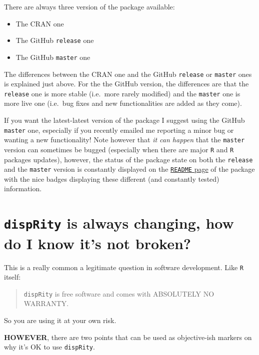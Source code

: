 \documentclass[
]{book}
\providecommand{\tightlist}{%
  \setlength{\itemsep}{0pt}\setlength{\parskip}{0pt}}
\begin{document}
There are always three version of the package available:

\begin{itemize}
\tightlist
\item
  The CRAN one
\item
  The GitHub \texttt{release} one
\item
  The GitHub \texttt{master} one
\end{itemize}

The differences between the CRAN one and the GitHub \texttt{release} or \texttt{master} ones is explained just above.
For the the GitHub version, the differences are that the \texttt{release} one is more stable (i.e.~more rarely modified) and the \texttt{master} one is more live one (i.e.~bug fixes and new functionalities are added as they come).

If you want the latest-latest version of the package I suggest using the GitHub \texttt{master} one, especially if you recently emailed me reporting a minor bug or wanting a new functionality!
Note however that \emph{it can happen} that the \texttt{master} version can sometimes be bugged (especially when there are major \texttt{R} and \texttt{R} packages updates), however, the status of the package state on both the \texttt{release} and the \texttt{master} version is constantly displayed on the \href{https://github.com/TGuillerme/dispRity/}{\texttt{README} page} of the package with the nice badges displaying these different (and constantly tested) information.

\hypertarget{disprity-is-always-changing-how-do-i-know-its-not-broken}{%
\section{\texorpdfstring{\texttt{dispRity} is always changing, how do I know it's not broken?}{dispRity is always changing, how do I know it's not broken?}}\label{disprity-is-always-changing-how-do-i-know-its-not-broken}}

This is a really common a legitimate question in software development. Like \texttt{R} itself:

\begin{quote}
\texttt{dispRity} is free software and comes with ABSOLUTELY NO WARRANTY.
\end{quote}

So you are using it at your own risk.

\textbf{HOWEVER}, there are two points that can be used as objective-ish markers on why it's OK to use \texttt{dispRity}.
\end{document}
